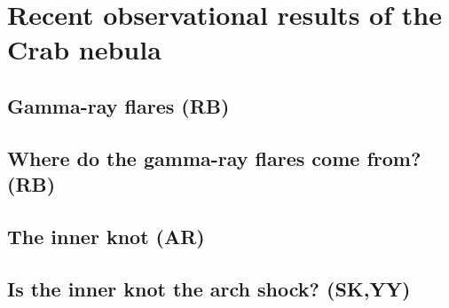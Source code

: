 \section{Recent observational results of the Crab nebula}
\subsection{Gamma-ray flares (RB)}
\subsection{Where do the gamma-ray flares come from?                  (RB)}
\subsection{The inner knot   (AR)}
\subsection{Is the inner knot the arch shock?                                      (SK,YY)}
